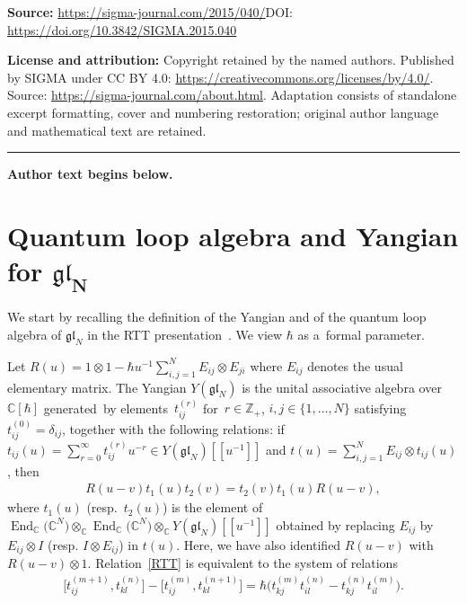 \documentclass[11pt]{article}
\numberwithin{theorem}{section}
\numberwithin{proposition}{section}
\numberwithin{lemma}{section}
\numberwithin{corollary}{section}
\numberwithin{definition}{section}
\numberwithin{example}{section}
\numberwithin{remark}{section}
\numberwithin{note}{section}
\DeclareMathOperator{\End}{End}
\numberwithin{equation}{section}
\begin{document}
\noindent\textbf{Source:} \url{https://sigma-journal.com/2015/040/}\quad DOI: \url{https://doi.org/10.3842/SIGMA.2015.040}\par
\noindent\textbf{License and attribution:} Copyright retained by the named authors. Published by SIGMA under CC BY 4.0: \url{https://creativecommons.org/licenses/by/4.0/}. Source: \url{https://sigma-journal.com/about.html}. Adaptation consists of standalone excerpt formatting, cover and numbering restoration; original author language and mathematical text are retained.\par
\medskip\hrule\medskip\noindent\textbf{Author text begins below.}\par
\setcounter{section}{1}
\setcounter{subsection}{0}
\setcounter{subsubsection}{0}
\setcounter{equation}{0}
\section[Quantum loop algebra and Yangian for $\mathfrak{gl}_N$]{Quantum loop algebra and Yangian for $\boldsymbol{\mathfrak{gl}_N}$}

We start by recalling the def\/inition of the Yangian and of the quantum loop algebra of $\mathfrak{gl}_N$ in
the RTT presentation~\cite{FRT}.
We view $\hbar$ as a~formal parameter.

\begin{definition}
\label{Ygln}
Let $R(u) = 1 \otimes 1 - \hbar u^{-1} \sum\limits_{i,j=1}^N E_{ij} \otimes E_{ji} $ where $E_{ij}$ denotes the usual
elementary matrix.
The Yangian $Y(\mathfrak{gl}_N)$ is the unital associative algebra over $\mathbb{C}[\hbar]$ generated~by
elements~$t_{ij}^{(r)}$ for~$r\in\mathbb{Z}_+$, $i,j \in \{1,\ldots,N\}$ satisfying $t_{ij}^{(0)}=\delta_{ij}$, together
with the following relations: if $t_{ij}(u)=\sum\limits_{r=0}^\infty {t_{ij}^{(r)}u^{-r}} \in
Y(\mathfrak{gl}_N)[[u^{-1}]]$ and $t(u) =\sum\limits_{i,j=1}^N {E_{ij} \otimes t_{ij}(u)}$, then
\begin{gather}
R(u-v)t_1(u)t_2(v)=t_2(v)t_1(u)R(u-v),
\label{RTT}
\end{gather}
where $t_1(u)$ (resp.\ $t_2(u)$) is the element of $\End_{\mathbb{C}}\big(\mathbb{C}^N\big) \otimes_{\mathbb{C}}
\End_{\mathbb{C}}\big(\mathbb{C}^N\big) \otimes_{\mathbb{C}} Y(\mathfrak{gl}_N)[[u^{-1}]]$ obtained by replacing
$E_{ij}$ by $E_{ij} \otimes I$ (resp.
$I \otimes E_{ij}$) in $t(u)$.
Here, we have also identif\/ied $R(u-v)$ with $R(u-v)\otimes 1$.
Relation~\eqref{RTT} is equivalent to the system of relations
\begin{gather*}
\big[t_{ij}^{(m+1)},t_{kl}^{(n)}\big]-\big[t_{ij}^{(m)},t_{kl}^{(n+1)}\big]
= \hbar\big(t_{kj}^{(m)}t_{il}^{(n)}-t_{kj}^{(n)}t_{il}^{(m)}\big).
\end{gather*}
\end{definition}
\end{document}
